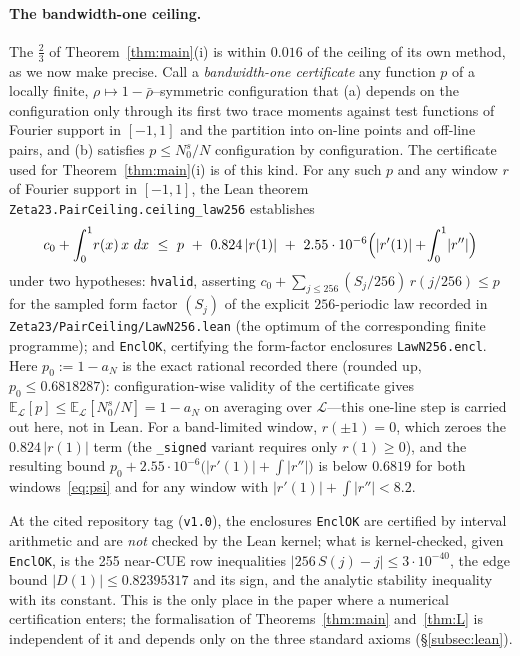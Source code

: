\documentclass[11pt]{amsart}
\newcommand{\repoTag}{v1.0}
\theoremstyle{definition}
\theoremstyle{remark}
\numberwithin{equation}{section}
\newcommand{\dd}{\,d}
\begin{document}
\paragraph*{The bandwidth-one ceiling.}
The $\tfrac23$ of Theorem~\ref{thm:main}(i) is within $0.016$ of the ceiling of its own method, as we now make precise. Call a \emph{bandwidth-one certificate} any function $p$ of a locally finite, $\rho\mapsto1-\bar\rho$--symmetric configuration that (a) depends on the configuration only through its first two trace moments against test functions of Fourier support in $[-1,1]$ and the partition into on-line points and off-line pairs, and (b) satisfies $p\le N_0^{s}/N$ configuration by configuration. The certificate used for Theorem~\ref{thm:main}(i) is of this kind. For any such $p$ and any window $r$ of Fourier support in $[-1,1]$, the Lean theorem \texttt{Zeta23.PairCeiling.ceiling\_law256} establishes
\[
c_0+\int_0^1\!r(x)\,x\,\dd x\ \le\ p\ +\ 0.824\,|r(1)|\ +\ 2.55\cdot10^{-6}\Bigl(|r'(1)|+\!\int_0^1\!|r''|\Bigr)
\]
under two hypotheses: \texttt{hvalid}, asserting $c_0+\sum_{j\le256}(S_j/256)\,r(j/256)\le p$ for the sampled form factor $(S_j)$ of the explicit $256$-periodic law recorded in \texttt{Zeta23/PairCeiling/LawN256.lean} (the optimum of the corresponding finite programme); and \texttt{EnclOK}, certifying the form-factor enclosures \texttt{LawN256.encl}. Here $p_0:=1-a_N$ is the exact rational recorded there (rounded up, $p_0\le0.6818287$): configuration-wise validity of the certificate gives $\mathbb E_{\mathcal L}[p]\le\mathbb E_{\mathcal L}[N_0^{s}/N]=1-a_N$ on averaging over $\mathcal L$---this one-line step is carried out here, not in Lean. For a band-limited window, $r(\pm1)=0$, which zeroes the $0.824\,|r(1)|$ term (the \texttt{\_signed} variant requires only $r(1)\ge0$), and the resulting bound $p_0+2.55\cdot10^{-6}\bigl(|r'(1)|+\!\int|r''|\bigr)$ is below $0.6819$ for both windows~\eqref{eq:psi} and for any window with $|r'(1)|+\!\int|r''|<8.2$.

At the cited repository tag (\texttt{\repoTag}), the enclosures \texttt{EnclOK} are certified by interval arithmetic and are \emph{not} checked by the Lean kernel; what is kernel-checked, given \texttt{EnclOK}, is the 255 near-CUE row inequalities $|256\,S(j)-j|\le3\cdot10^{-40}$, the edge bound $|D(1)|\le0.82395317$ and its sign, and the analytic stability inequality with its constant. This is the only place in the paper where a numerical certification enters; the formalisation of Theorems~\ref{thm:main} and~\ref{thm:L} is independent of it and depends only on the three standard axioms (\S\ref{subsec:lean}).
\end{document}
